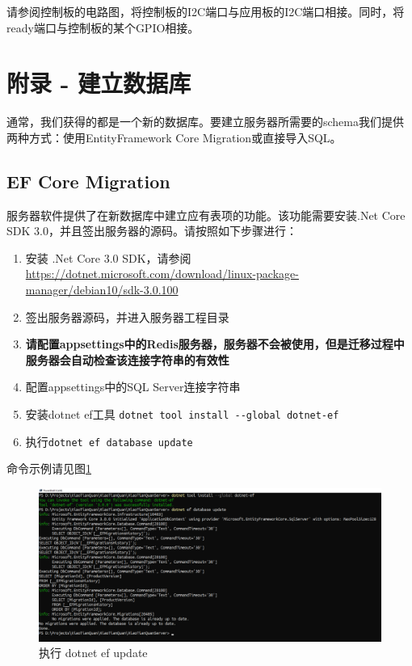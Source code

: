 \documentclass[a4paper,11pt]{article}
\theoremstyle{definition}
\begin{document}
请参阅控制板的电路图，将控制板的I2C端口与应用板的I2C端口相接。同时，将ready端口与控制板的某个GPIO相接。


\appendix

\section{附录 - 建立数据库}\label{sec:newdb}

通常，我们获得的都是一个新的数据库。要建立服务器所需要的schema我们提供两种方式：使用EntityFramework Core Migration或直接导入SQL。

\subsection{EF Core Migration}
服务器软件提供了在新数据库中建立应有表项的功能。该功能需要安装.Net Core SDK 3.0，并且签出服务器的源码。请按照如下步骤进行：

\begin{enumerate}
  \item 安装 .Net Core 3.0 SDK，请参阅 \\ \url{https://dotnet.microsoft.com/download/linux-package-manager/debian10/sdk-3.0.100}
  \item 签出服务器源码，并进入服务器工程目录
  \item \textbf{请配置appsettings中的Redis服务器，服务器不会被使用，但是迁移过程中服务器会自动检查该连接字符串的有效性}
  \item 配置appsettings中的SQL Server连接字符串
  \item 安装dotnet ef工具 \verb|dotnet tool install --global dotnet-ef|
  \item 执行\verb|dotnet ef database update|
\end{enumerate}

命令示例请见图\ref{fig:ef-update}

    \begin{figure}[htbp]
    \minipage[b][][b]{\textwidth}
        \includegraphics[width=\linewidth]{ef-update.png}
        \caption{执行 dotnet ef update}
        \label{fig:ef-update}
    \endminipage\hfill
    \end{figure}
\end{document}

